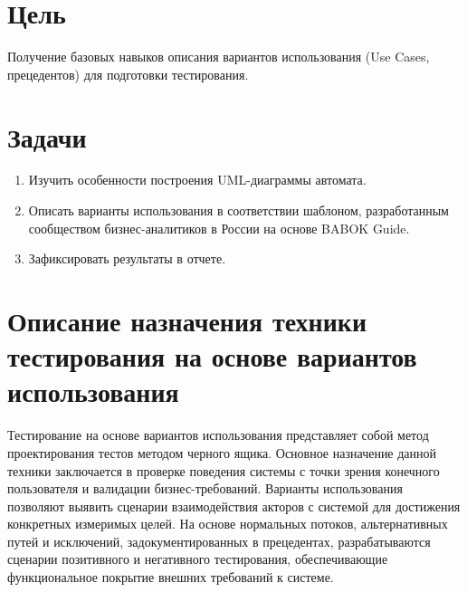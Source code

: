 \usetikzlibrary{arrows.meta, shapes.geometric, positioning}

\section*{Цель}
Получение базовых навыков описания вариантов использования (Use
Cases, прецедентов) для подготовки тестирования.

\section*{Задачи}
\begin{enumerate}
    \item Изучить особенности построения UML-диаграммы автомата.
    \item Описать варианты использования в соответствии шаблоном, разработанным сообществом бизнес-аналитиков в России на основе BABOK Guide.
    \item Зафиксировать результаты в отчете.
\end{enumerate}

\section{Описание назначения техники тестирования на основе вариантов использования}
Тестирование на основе вариантов использования представляет собой метод проектирования тестов методом черного ящика. Основное назначение данной техники заключается в проверке поведения системы с точки зрения конечного пользователя и валидации бизнес-требований. Варианты использования позволяют выявить сценарии взаимодействия акторов с системой для достижения конкретных измеримых целей. На основе нормальных потоков, альтернативных путей и исключений, задокументированных в прецедентах, разрабатываются сценарии позитивного и негативного тестирования, обеспечивающие функциональное покрытие внешних требований к системе.

